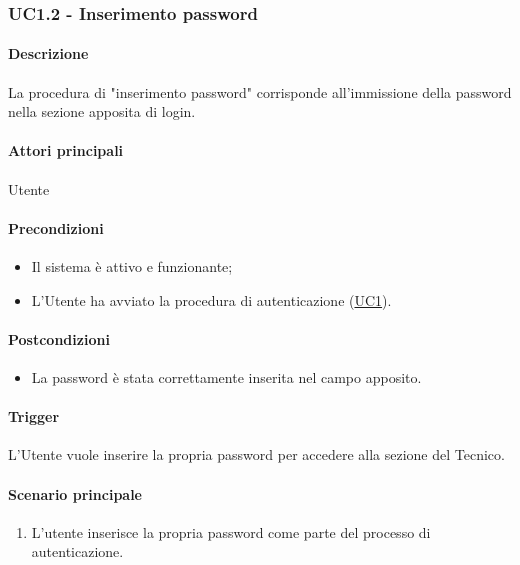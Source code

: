 
\subsubsection{UC1.2 - Inserimento password}\label{UC1point2}
\paragraph*{Descrizione}
La procedura di "inserimento password" corrisponde all'immissione della password nella sezione apposita di login.

\paragraph*{Attori principali}
Utente

\paragraph*{Precondizioni}
\begin{itemize}
  \item Il sistema è attivo e funzionante;
  \item L'Utente ha avviato la procedura di autenticazione (\hyperref[UC1]{UC1}). 
\end{itemize}

\paragraph*{Postcondizioni}
\begin{itemize}
  \item La password è stata correttamente inserita nel campo apposito.
\end{itemize}

\paragraph*{Trigger}
L'Utente vuole inserire la propria password per accedere alla sezione del Tecnico.

\paragraph*{Scenario principale}
\begin{enumerate}
  \item L'utente inserisce la propria password come parte del processo di autenticazione.
\end{enumerate}
